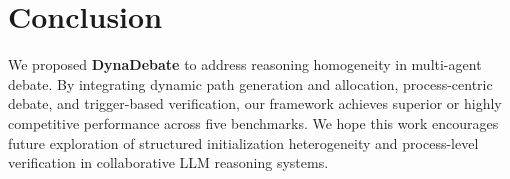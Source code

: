 \vspace{-4pt}
\section{Conclusion}
\label{sec:conclusion}
We proposed \textbf{DynaDebate} to address reasoning homogeneity in multi-agent debate. By integrating dynamic path generation and allocation, process-centric debate, and trigger-based verification, our framework achieves superior or highly competitive performance across five benchmarks. We hope this work encourages future exploration of structured initialization heterogeneity and process-level verification in collaborative LLM reasoning systems.

